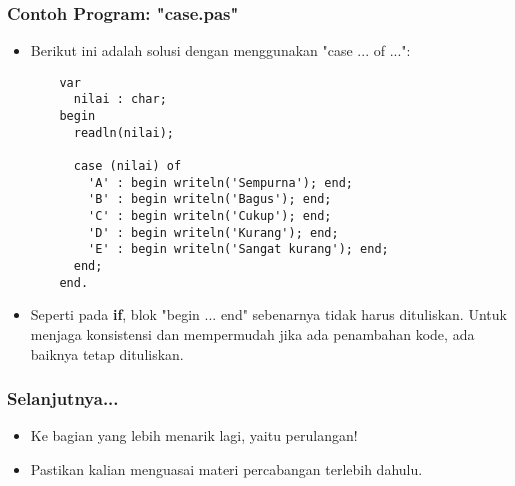 \begin{frame}[fragile]
\frametitle{Contoh Program: "case.pas"}
\begin{itemize}
  \item Berikut ini adalah solusi dengan menggunakan "case ... of ...":
  \begin{lstlisting}
    var
      nilai : char;
    begin
      readln(nilai);

      case (nilai) of
        'A' : begin writeln('Sempurna'); end;
        'B' : begin writeln('Bagus'); end;
        'C' : begin writeln('Cukup'); end;
        'D' : begin writeln('Kurang'); end;
        'E' : begin writeln('Sangat kurang'); end;
      end;
    end.
  \end{lstlisting}
  \item Seperti pada \textbf{if}, blok "begin ... end" sebenarnya tidak harus dituliskan. Untuk menjaga konsistensi dan mempermudah \newline jika ada penambahan kode, ada baiknya tetap dituliskan.
\end{itemize}
\end{frame}

\begin{frame}
\frametitle{Selanjutnya...}
\begin{itemize}
  \item Ke bagian yang lebih menarik lagi, yaitu perulangan!
  \item Pastikan kalian menguasai materi percabangan terlebih dahulu.
\end{itemize}
\end{frame}


